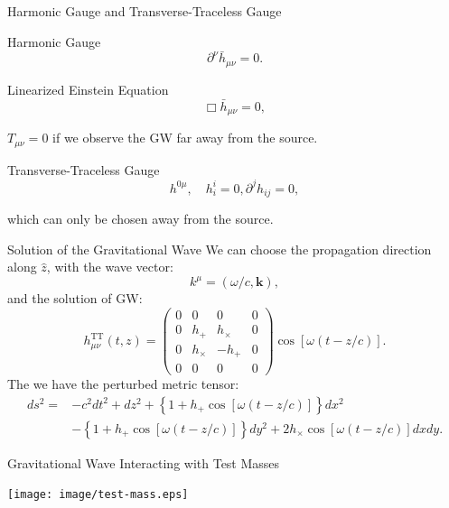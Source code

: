 \documentclass[xcolor=dvipsnames]{beamer}
\begin{document}
\begin{frame}[t]{Harmonic Gauge and Transverse-Traceless Gauge}
  \begin{block}{Harmonic Gauge}
    \begin{equation*}
      \partial^\nu \bar{h}_{\mu\nu} = 0.
    \end{equation*}
  \end{block}
  \begin{block}{Linearized Einstein Equation}
    \begin{equation*}
      \Box \bar{h}_{\mu\nu} = 0,
    \end{equation*}
  \end{block}
  $T_{\mu\nu} = 0$ if we observe the GW far away from the source.
  \begin{block}{Transverse-Traceless Gauge}
    \begin{equation*}
      h^{0\mu}, \quad h^i_i = 0, \partial^j h_{ij} = 0,
    \end{equation*}
  \end{block}
  which can only be chosen away from the source.
\end{frame}

\begin{frame}[t]{Solution of the Gravitational Wave}
  We can choose the propagation direction along $\hat{z}$, with the wave vector:
  \begin{equation*}
    k^\mu = (\omega/c, \mathbf{k}),
  \end{equation*}
  and the solution of GW:
  \begin{equation*}
    h^{\text{TT}}_{\mu\nu} (t, z) =
    \begin{pmatrix}
      0 & 0 & 0 & 0 \\
      0 & h_{+} & h_{\times} & 0 \\
      0 & h_{\times} & -h_{+} & 0 \\
      0 & 0 & 0 & 0
    \end{pmatrix}
    \cos \left[ \omega(t - z/c) \right].
  \end{equation*}
  The we have the perturbed metric tensor:
  \begin{align*}
    ds^2 = & -c^2 dt^2 + dz^2 + \left\{ 1 + h_{+}\cos[\omega(t - z/c)] \right\} dx^2 \\
    & - \left\{ 1 + h_{+}\cos[\omega(t - z/c)] \right\} dy^2 + 2h_{\times}\cos[\omega(t - z/c)] dxdy.
  \end{align*}
\end{frame}

\begin{frame}[t]{Gravitational Wave Interacting with Test Masses}
  \begin{center}
    \texttt{[image: image/test-mass.eps]}
  \end{center}
\end{frame}
\end{document}
